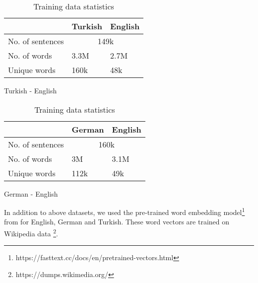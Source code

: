 


\begin{table}[!htb]
	\begin{subtable}{.5\linewidth}
		\centering
		
		\begin{tabular}{|l|l|l|}
			\hline
			& Turkish     & English     \\ \hline
			No. of sentences         & \multicolumn{2}{c|}{149k} \\ \hline
			No. of words             & 3.3M        & 2.7M        \\ \hline
			Unique words      & 160k         & 48k         \\ \hline
		\end{tabular}
		\caption{Turkish - English}
	\end{subtable}%
	\begin{subtable}{.5\linewidth}
		\centering
		
		\begin{tabular}{|l|l|l|}
			\hline
			& German     & English     \\ \hline
			No. of sentences         & \multicolumn{2}{c|}{160k} \\ \hline
			No. of words             & 3M        & 3.1M        \\ \hline
			Unique words      & 112k         & 49k         \\ \hline
		\end{tabular}
		\caption{German - English}
	\end{subtable}
	\caption{Training data statistics} 
	\label{stats}
\end{table}

In addition to above datasets, we used the pre-trained word embedding model\footnote{https://fasttext.cc/docs/en/pretrained-vectors.html} from \cite{bojanowski2016enriching} for English, German and Turkish. These word vectors are trained on Wikipedia data \footnote{https://dumps.wikimedia.org/}. 


